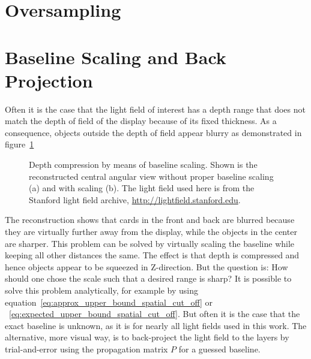\section{Oversampling}
\label{sec:oversampling}


\section{Baseline Scaling and Back Projection}
\label{sec:baseline_scaling}

Often it is the case that the light field of interest has a depth range that does not match the depth of field of the display because of its fixed thickness.
As a consequence, objects outside the depth of field appear blurry as demonstrated in figure~\ref{fig:reconstruction_baseline_unscaled}
\begin{figure}[tb]
	\begin{subfigure}{0.5\textwidth}
		\centering
		
		\caption{}
		\label{fig:reconstruction_baseline_unscaled}
	\end{subfigure}%
	\begin{subfigure}{0.5\textwidth}
		\centering
		
		\caption{}
		\label{fig:reconstruction_baseline_scaled_shifted}
	\end{subfigure}
	\caption[Baseline scaling]
			{Depth compression by means of baseline scaling.
			 Shown is the reconstructed central angular view without proper baseline scaling (a) and with scaling (b).
			 The light field used here is from the Stanford light field archive, \mbox{\url{http://lightfield.stanford.edu}}.}
	\label{fig:baseline_scaling}
\end{figure}
The reconstruction shows that cards in the front and back are blurred because they are virtually further away from the display, while the objects in the center are sharper.
This problem can be solved by virtually scaling the baseline while keeping all other distances the same.
The effect is that depth is compressed and hence objects appear to be squeezed in Z-direction.
But the question is: How should one chose the scale such that a desired range is sharp?
It is possible to solve this problem analytically, for example by using equation~\ref{eq:approx_upper_bound_spatial_cut_off} or ~\ref{eq:expected_upper_bound_spatial_cut_off}.
But often it is the case that the exact baseline is unknown, as it is for nearly all light fields used in this work.
The alternative, more visual way, is to back-project the light field to the layers by trial-and-error using the propagation matrix $P$ for a guessed baseline.
